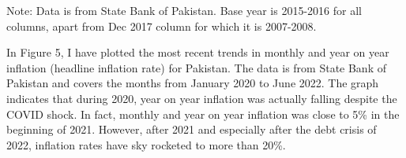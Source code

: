 \documentclass[12pt]{article}
\newcommand{\1}{\mathbbm 1}
\begin{document}
		\begin{table}[H]%
			\def\arraystretch{1}
			\begin{center}
				{\sc \caption{Annual National Inflation (December 2017 to December 2021)}}
				\begin{adjustbox}{width=0.8\textwidth}
					\setlength{\tabcolsep}{1pt}
				\end{adjustbox}
			\end{center}
			{\footnotesize{Note: Data is from State Bank of Pakistan. Base year is 2015-2016 for all columns, apart from Dec 2017 column for which it is 2007-2008.}} %
		\end{table}
		
		
		
		In Figure 5, I have plotted the most recent trends in monthly and year on year inflation (headline inflation rate)  for Pakistan. The data is from State Bank of Pakistan and covers the months from January 2020 to June 2022. The graph indicates that during 2020, year on year inflation was actually falling despite the COVID shock. In fact, monthly and year on year inflation was close to 5\% in the beginning of 2021. However, after 2021 and especially after the debt crisis of 2022, inflation rates have sky rocketed to more than 20\%. 
		
\end{document}
